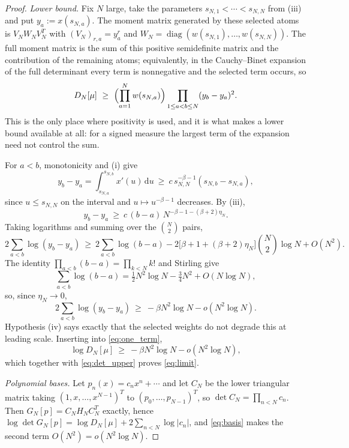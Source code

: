 \documentclass[11pt]{amsart}
\numberwithin{equation}{section}
\theoremstyle{plain}
\theoremstyle{definition}
\theoremstyle{remark}
\newcommand{\dd}{\,\mathrm d}
\begin{document}
\begin{proof}
\emph{Lower bound.} Fix $N$ large, take the parameters $s_{N,1}<\cdots<s_{N,N}$ from (iii) and put
$y_{a}:=x(s_{N,a})$. The moment matrix generated by these selected atoms is $V_{N}W_{N}V_{N}^{T}$
with $(V_{N})_{r,a}=y_{a}^{r}$ and $W_{N}=\operatorname{diag}(w(s_{N,1}),\dots,w(s_{N,N}))$. The full
moment matrix is the sum of this positive semidefinite matrix and the contribution of the remaining
atoms; equivalently, in the Cauchy--Binet expansion of the full determinant every term is
nonnegative and the selected term occurs, so
\begin{equation}
D_{N}[\mu]\ \ge\ \Bigl(\prod_{a=1}^{N}w(s_{N,a})\Bigr)\prod_{1\le a<b\le N}(y_{b}-y_{a})^{2}.
\label{eq:one_term}
\end{equation}
This is the only place where positivity is used, and it is what makes a lower bound available at
all: for a signed measure the largest term of the expansion need not control the sum.

For $a<b$, monotonicity and (i) give
\[
y_{b}-y_{a}=\int_{s_{N,a}}^{s_{N,b}}x'(u)\dd u\ \ge\ c\,s_{N,N}^{-\beta-1}(s_{N,b}-s_{N,a}),
\]
since $u\le s_{N,N}$ on the interval and $u\mapsto u^{-\beta-1}$ decreases. By (iii),
\begin{equation}
y_{b}-y_{a}\ \ge\ c\,(b-a)\,N^{-\beta-1-(\beta+2)\eta_{N}}.
\label{eq:gap_lower}
\end{equation}
Taking logarithms and summing over the $\binom N2$ pairs,
\begin{equation}
2\sum_{a<b}\log(y_{b}-y_{a})\ \ge\ 2\sum_{a<b}\log(b-a)
-2\bigl[\beta+1+(\beta+2)\eta_{N}\bigr]\binom N2\log N+O(N^{2}).
\label{eq:vdm_lower}
\end{equation}
The identity $\prod_{a<b}(b-a)=\prod_{k<N}k!$ and Stirling give
\begin{equation}
\sum_{a<b}\log(b-a)=\tfrac12N^{2}\log N-\tfrac34N^{2}+O(N\log N),
\label{eq:pairsum}
\end{equation}
so, since $\eta_{N}\to0$,
\[
2\sum_{a<b}\log(y_{b}-y_{a})\ \ge\ -\beta N^{2}\log N-o(N^{2}\log N).
\]
Hypothesis (iv) says exactly that the selected weights do not degrade this at leading scale.
Inserting into \eqref{eq:one_term},
\begin{equation}
\log D_{N}[\mu]\ \ge\ -\beta N^{2}\log N-o(N^{2}\log N),
\label{eq:det_lower}
\end{equation}
which together with \eqref{eq:det_upper} proves \eqref{eq:limit}.

\emph{Polynomial bases.} Let $p_{n}(x)=c_{n}x^{n}+\cdots$ and let $C_{N}$ be the lower triangular
matrix taking $(1,x,\dots,x^{N-1})^{T}$ to $(p_{0},\dots,p_{N-1})^{T}$, so
$\det C_{N}=\prod_{n<N}c_{n}$. Then $G_{N}[p]=C_{N}H_{N}C_{N}^{T}$ exactly, hence
$\log\det G_{N}[p]=\log D_{N}[\mu]+2\sum_{n<N}\log|c_{n}|$, and \eqref{eq:basis} makes the second
term $O(N^{2})=o(N^{2}\log N)$.
\end{proof}
\end{document}
